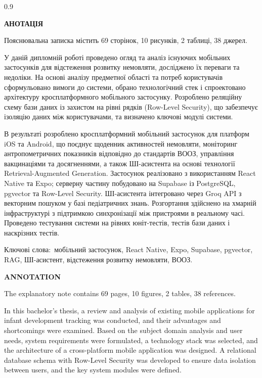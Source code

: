 \newcommand{\keyword}{Ключові слова:}

\begin{spacing}{0.9}

\begin{center}
\large{\MakeUppercase{\textbf{Анотація}}}
\end{center}

Пояснювальна записка містить 69 сторінок, 10 рисунків, 2 таблиці, 38 джерел.

У даній дипломній роботі проведено огляд та аналіз існуючих мобільних застосунків для відстеження розвитку немовляти, досліджено їх переваги та недоліки. На основі аналізу предметної області та потреб користувачів сформульовано вимоги до системи, обрано технологічний стек і спроектовано архітектуру кросплатформного мобільного застосунку. Розроблено реляційну схему бази даних із захистом на рівні рядків (Row-Level Security), що забезпечує ізоляцію даних між користувачами, та визначено ключові модулі системи.

В результаті розроблено кросплатформний мобільний застосунок для платформ iOS та Android, що поєднує щоденник активностей немовляти, моніторинг антропометричних показників відповідно до стандартів ВООЗ, управління вакцинаціями та досягненнями, а також ШІ-асистента на основі технології Retrieval-Augmented Generation. Застосунок реалізовано з використанням React Native та Expo; серверну частину побудовано на Supabase із PostgreSQL, pgvector та Row-Level Security. ШІ-асистента інтегровано через Groq API з векторним пошуком у базі педіатричних знань. Розгортання здійснено на хмарній інфраструктурі з підтримкою синхронізації між пристроями в реальному часі. Проведено тестування системи на рівнях юніт-тестів, тестів бази даних і наскрізних тестів.

\keyword\ мобільний застосунок, React Native, Expo, Supabase, pgvector, RAG, ШІ-асистент, відстеження розвитку немовляти, ВООЗ.

\vspace{0.5em}

\begin{center}
\large{\MakeUppercase{\textbf{Annotation}}}
\end{center}

The explanatory note contains 69 pages, 10 figures, 2 tables, 38 references.

In this bachelor's thesis, a review and analysis of existing mobile applications for infant development tracking was conducted, and their advantages and shortcomings were examined. Based on the subject domain analysis and user needs, system requirements were formulated, a technology stack was selected, and the architecture of a cross-platform mobile application was designed. A relational database schema with Row-Level Security was developed to ensure data isolation between users, and the key system modules were defined.


\end{spacing}

